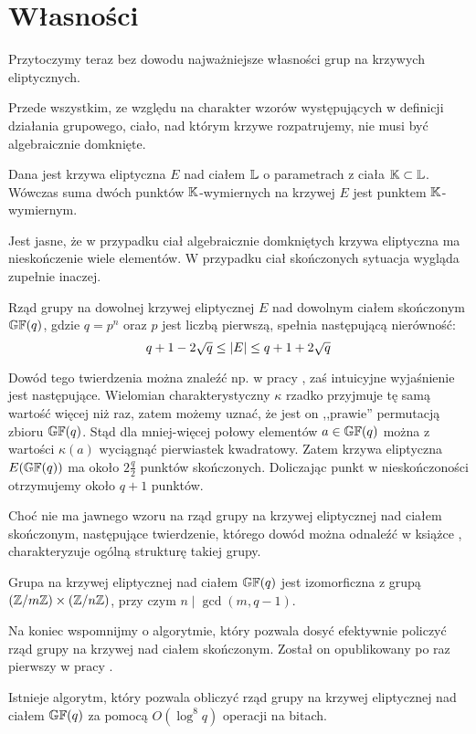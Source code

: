 \section{Własności}

Przytoczymy teraz bez dowodu najważniejsze własności
grup na krzywych eliptycznych.

Przede wszystkim, ze względu na charakter wzorów występujących
w definicji działania grupowego,
ciało, nad którym krzywe rozpatrujemy, nie musi być algebraicznie domknięte.

\begin{fact}
Dana jest krzywa eliptyczna $E$ nad ciałem $\mathbb{L}$
o parametrach z ciała $\mathbb{K} \subset \mathbb{L}$.
Wówczas suma dwóch punktów $\mathbb{K}$-wymiernych na krzywej $E$
jest punktem $\mathbb{K}$-wymiernym.
\end{fact}

Jest jasne, że w przypadku ciał algebraicznie domkniętych krzywa eliptyczna
ma nieskończenie wiele elementów.
W przypadku ciał skończonych sytuacja wygląda zupełnie inaczej.

\begin{theorem}[Hasse]
Rząd grupy na dowolnej krzywej eliptycznej $E$
nad dowolnym ciałem skończonym $\mathbb{GF}(q)$,
gdzie $q = p^n$ oraz $p$ jest liczbą pierwszą,
spełnia następującą nierówność:
\begin{equation}
q + 1 - 2\sqrt{q} \leq \lvert E\rvert \leq q + 1 + 2\sqrt{q}
\end{equation}
\end{theorem}

Dowód tego twierdzenia można znaleźć np. w pracy \cite{ecintro1},
zaś intuicyjne wyjaśnienie jest następujące.
Wielomian charakterystyczny $\kappa$ rzadko przyjmuje tę samą wartość
więcej niż raz, zatem możemy uznać, że jest on ,,prawie''
permutacją zbioru $\mathbb{GF}(q)$.
Stąd dla mniej-więcej połowy elementów $a \in \mathbb{GF}(q)$
można z wartości $\kappa(a)$ wyciągnąć pierwiastek kwadratowy.
Zatem krzywa eliptyczna $E(\mathbb{GF}(q))$ ma około $2\frac{q}{2}$ punktów skończonych.
Doliczając punkt w nieskończoności otrzymujemy około $q + 1$ punktów.

Choć nie ma jawnego wzoru
na rząd grupy na krzywej eliptycznej nad ciałem skończonym,
następujące twierdzenie,
którego dowód można odnaleźć w książce \cite{silverman},
charakteryzuje ogólną strukturę takiej grupy.

\begin{theorem}\label{finite_curve_structure_theorem}
Grupa na krzywej eliptycznej nad ciałem $\mathbb{GF}(q)$
jest izomorficzna z grupą $(\mathbb{Z}/m\mathbb{Z}) \times (\mathbb{Z}/n\mathbb{Z})$,
przy czym $n \mid \gcd(m, q-1)$.
\end{theorem}

Na koniec wspomnijmy o algorytmie,
który pozwala dosyć efektywnie policzyć
rząd grupy na krzywej nad ciałem skończonym.
Został on opublikowany po raz pierwszy w pracy \cite{schoof}.

\begin{theorem}[Schoof]
Istnieje algorytm, który pozwala obliczyć rząd grupy na krzywej eliptycznej
nad ciałem $\mathbb{GF}(q)$ za pomocą $O(\log^8 q)$ operacji na bitach.
\end{theorem}
